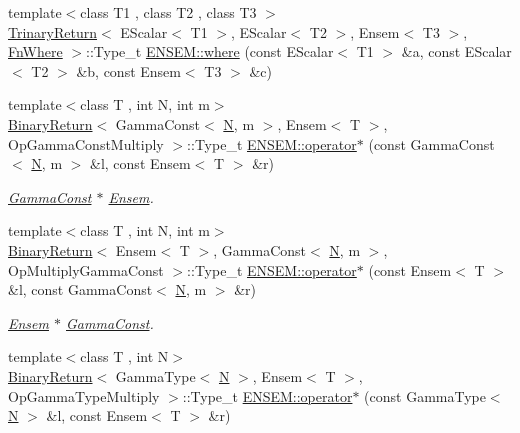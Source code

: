\begin{DoxyCompactItemize}
\item 
{\footnotesize template$<$class T1 , class T2 , class T3 $>$ }\\\mbox{\hyperlink{structTrinaryReturn}{Trinary\+Return}}$<$ E\+Scalar$<$ T1 $>$, E\+Scalar$<$ T2 $>$, Ensem$<$ T3 $>$, \mbox{\hyperlink{structFnWhere}{Fn\+Where}} $>$\+::Type\+\_\+t \mbox{\hyperlink{group__eensem_gab6c29ad51b23e921cd47448cfa4eabaa}{E\+N\+S\+E\+M\+::where}} (const E\+Scalar$<$ T1 $>$ \&a, const E\+Scalar$<$ T2 $>$ \&b, const Ensem$<$ T3 $>$ \&c)
\item 
{\footnotesize template$<$class T , int N, int m$>$ }\\\mbox{\hyperlink{structBinaryReturn}{Binary\+Return}}$<$ Gamma\+Const$<$ \mbox{\hyperlink{adat__devel_2lib_2hadron_2operator__name__util_8cc_a7722c8ecbb62d99aee7ce68b1752f337}{N}}, m $>$, Ensem$<$ T $>$, Op\+Gamma\+Const\+Multiply $>$\+::Type\+\_\+t \mbox{\hyperlink{group__eensem_gab92286e5b611f00cb8f733f9d41d06a4}{E\+N\+S\+E\+M\+::operator$\ast$}} (const Gamma\+Const$<$ \mbox{\hyperlink{adat__devel_2lib_2hadron_2operator__name__util_8cc_a7722c8ecbb62d99aee7ce68b1752f337}{N}}, m $>$ \&l, const Ensem$<$ T $>$ \&r)
\begin{DoxyCompactList}\small\item\em \mbox{\hyperlink{classENSEM_1_1GammaConst}{Gamma\+Const}} $\ast$ \mbox{\hyperlink{classENSEM_1_1Ensem}{Ensem}}. \end{DoxyCompactList}\item 
{\footnotesize template$<$class T , int N, int m$>$ }\\\mbox{\hyperlink{structBinaryReturn}{Binary\+Return}}$<$ Ensem$<$ T $>$, Gamma\+Const$<$ \mbox{\hyperlink{adat__devel_2lib_2hadron_2operator__name__util_8cc_a7722c8ecbb62d99aee7ce68b1752f337}{N}}, m $>$, Op\+Multiply\+Gamma\+Const $>$\+::Type\+\_\+t \mbox{\hyperlink{group__eensem_gaada3f84ca5744bafe60557482cc90c26}{E\+N\+S\+E\+M\+::operator$\ast$}} (const Ensem$<$ T $>$ \&l, const Gamma\+Const$<$ \mbox{\hyperlink{adat__devel_2lib_2hadron_2operator__name__util_8cc_a7722c8ecbb62d99aee7ce68b1752f337}{N}}, m $>$ \&r)
\begin{DoxyCompactList}\small\item\em \mbox{\hyperlink{classENSEM_1_1Ensem}{Ensem}} $\ast$ \mbox{\hyperlink{classENSEM_1_1GammaConst}{Gamma\+Const}}. \end{DoxyCompactList}\item 
{\footnotesize template$<$class T , int N$>$ }\\\mbox{\hyperlink{structBinaryReturn}{Binary\+Return}}$<$ Gamma\+Type$<$ \mbox{\hyperlink{adat__devel_2lib_2hadron_2operator__name__util_8cc_a7722c8ecbb62d99aee7ce68b1752f337}{N}} $>$, Ensem$<$ T $>$, Op\+Gamma\+Type\+Multiply $>$\+::Type\+\_\+t \mbox{\hyperlink{group__eensem_ga399b896691f2d528edcade561c6e571d}{E\+N\+S\+E\+M\+::operator$\ast$}} (const Gamma\+Type$<$ \mbox{\hyperlink{adat__devel_2lib_2hadron_2operator__name__util_8cc_a7722c8ecbb62d99aee7ce68b1752f337}{N}} $>$ \&l, const Ensem$<$ T $>$ \&r)

\end{DoxyCompactItemize}
